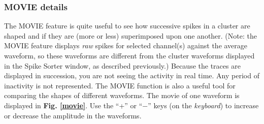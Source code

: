 \documentclass[12pt]{article}
\begin{document}
\subsubsection{\sf MOVIE details}
\label{moviedetails}
The {\sf MOVIE} feature is quite useful to see how successive spikes
in a cluster are shaped and if they are (more or less) superimposed
upon one another. (Note: the {\sf MOVIE} feature displays \textit{raw}
spikes for selected channel(s) against the average waveform, so these
waveforms are different from the cluster waveforms displayed in the
Spike Sorter window, as described previously.) Because the traces are
displayed in succession, you are not seeing the activity in real
time. Any period of inactivity is not represented. The {\sf MOVIE}
function is also a useful tool for comparing the shapes of different
waveforms. The movie of one waveform is displayed in
\textbf{Fig. \ref{movie}}.  Use the ``+'' or ``$-${}'' keys (on the
\textit{keyboard}) to increase or decrease the amplitude in the
waveforms.
\begin{center}
  \label{movie}
\end{center}
\end{document}
